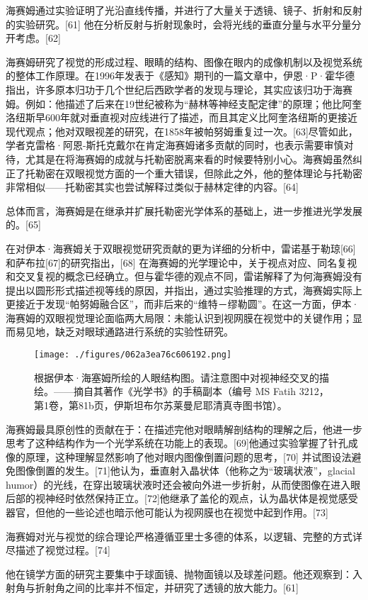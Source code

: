 海赛姆通过实验证明了光沿直线传播，并进行了大量关于透镜、镜子、折射和反射的实验研究。[61] 他在分析反射与折射现象时，会将光线的垂直分量与水平分量分开考虑。[62]

海赛姆研究了视觉的形成过程、眼睛的结构、图像在眼内的成像机制以及视觉系统的整体工作原理。在1996年发表于《感知》期刊的一篇文章中，伊恩·P·霍华德指出，许多原本归功于几个世纪后西欧学者的发现与理论，其实应该归功于海赛姆。例如：他描述了后来在19世纪被称为“赫林等神经支配定律”的原理；他比阿奎洛纽斯早600年就对垂直视对应线进行了描述，而且其定义比阿奎洛纽斯的更接近现代观点；他对双眼视差的研究，在1858年被帕努姆重复过一次。[63]尽管如此，学者克雷格·阿恩-斯托克戴尔在肯定海赛姆诸多贡献的同时，也表示需要审慎对待，尤其是在将海赛姆的成就与托勒密脱离来看的时候要特别小心。海赛姆虽然纠正了托勒密在双眼视觉方面的一个重大错误，但除此之外，他的整体理论与托勒密非常相似——托勒密其实也尝试解释过类似于赫林定律的内容。[64]

总体而言，海赛姆是在继承并扩展托勒密光学体系的基础上，进一步推进光学发展的。[65]

在对伊本·海赛姆关于双眼视觉研究贡献的更为详细的分析中，雷诺基于勒琼[66]和萨布拉[67]的研究指出，[68] 在海赛姆的光学理论中，关于视点对应、同名复视和交叉复视的概念已经确立。但与霍华德的观点不同，雷诺解释了为何海赛姆没有提出以圆形形式描述视等线的原因，并指出，通过实验推理的方式，海赛姆实际上更接近于发现“帕努姆融合区”，而非后来的“维特－缪勒圆”。在这一方面，伊本·海赛姆的双眼视觉理论面临两大局限：未能认识到视网膜在视觉中的关键作用；显而易见地，缺乏对眼球通路进行系统的实验性研究。
\begin{figure}[ht]
\centering
\texttt{[image: ./figures/062a3ea76c606192.png]}
\caption{根据伊本·海塞姆所绘的人眼结构图。请注意图中对视神经交叉的描绘。——摘自其著作《光学书》的手稿副本（编号 MS Fatih 3212，第1卷，第81b页，伊斯坦布尔苏莱曼尼耶清真寺图书馆）。} \label{fig_YBH_2}
\end{figure}
海赛姆最具原创性的贡献在于：在描述完他对眼睛解剖结构的理解之后，他进一步思考了这种结构作为一个光学系统在功能上的表现。[69]他通过实验掌握了针孔成像的原理，这种理解显然影响了他对眼内图像倒置问题的思考，[70] 并试图设法避免图像倒置的发生。[71]他认为，垂直射入晶状体（他称之为“玻璃状液”，glacial humor）的光线，在穿出玻璃状液时还会被向外进一步折射，从而使图像在进入眼后部的视神经时依然保持正立。[72]他继承了盖伦的观点，认为晶状体是视觉感受器官，但他的一些论述也暗示他可能认为视网膜也在视觉中起到作用。[73]

海赛姆对光与视觉的综合理论严格遵循亚里士多德的体系，以逻辑、完整的方式详尽描述了视觉过程。[74]

他在镜学方面的研究主要集中于球面镜、抛物面镜以及球差问题。他还观察到：入射角与折射角之间的比率并不恒定，并研究了透镜的放大能力。[61]
